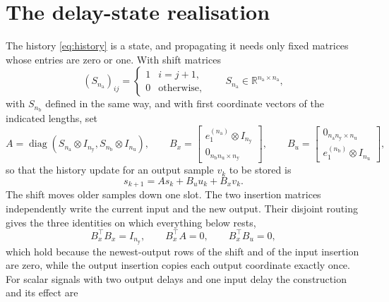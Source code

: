 \documentclass[11pt,a4paper]{article}
\newcommand{\R}{\mathbb R}
\newcommand{\diag}{\operatorname{diag}}
\theoremstyle{remark}
\begin{document}
\section{The delay-state realisation}\label{sec:realisation}
The history \eqref{eq:history} is a state, and propagating it needs only fixed matrices whose
entries are zero or one. With shift matrices
\begin{equation*}
(S_{n_{\mathrm a}})_{ij}=\begin{cases}1&i=j+1,\\0&\text{otherwise},\end{cases}
\qquad S_{n_{\mathrm a}}\in\R^{n_{\mathrm a}\times n_{\mathrm a}},
\end{equation*}
with \(S_{n_{\mathrm b}}\) defined in the same way, and with first coordinate vectors of the
indicated lengths, set
\begin{equation}\label{eq:routing}
A=\diag(S_{n_{\mathrm a}}\otimes I_{n_{\mathrm y}},S_{n_{\mathrm b}}\otimes I_{n_{\mathrm u}}),
\qquad
B_x=\begin{bmatrix}e_1^{(n_{\mathrm a})}\otimes I_{n_{\mathrm y}}\\
0_{n_{\mathrm b}n_{\mathrm u}\times n_{\mathrm y}}\end{bmatrix},
\qquad
B_u=\begin{bmatrix}0_{n_{\mathrm a}n_{\mathrm y}\times n_{\mathrm u}}\\
e_1^{(n_{\mathrm b})}\otimes I_{n_{\mathrm u}}\end{bmatrix},
\end{equation}
so that the history update for an output sample \(v_k\) to be stored is
\begin{equation}\label{eq:storage}
s_{k+1}=As_k+B_uu_k+B_xv_k.
\end{equation}
The shift moves older samples down one slot. The two insertion matrices independently write the
current input and the new output. Their disjoint routing gives the three identities on which
everything below rests,
\begin{equation}\label{eq:routingidentities}
B_x^\top B_x=I_{n_{\mathrm y}},\qquad B_x^\top A=0,\qquad B_x^\top B_u=0,
\end{equation}
which hold because the newest-output rows of the shift and of the input insertion are zero, while
the output insertion copies each output coordinate exactly once. For scalar signals with two
output delays and one input delay the construction and its effect are
\end{document}
